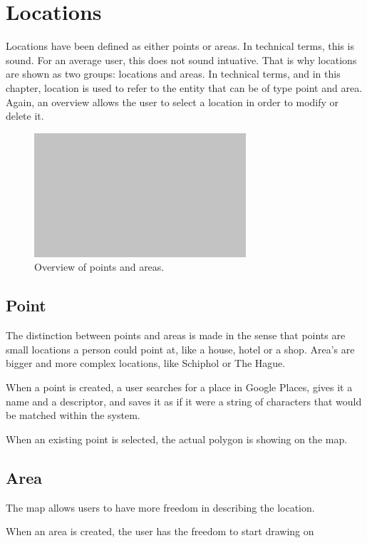 \section{Locations}
Locations have been defined as either points or areas. In technical terms, this is sound. For an average user, this does not sound intuative. That is why locations are shown as two groups: locations and areas. In technical terms, and in this chapter, location is used to refer to the entity that can be of type point and area. Again, an overview allows the user to select a location in order to modify or delete it.

\begin{figure}[H]
	\centering
	\includegraphics[width=0.7\textwidth]{Blank}
	\caption[Locations Overview]{Overview of points and areas.}
	\label{fig:Locations Overview}
\end{figure}

\subsection{Point}
The distinction between points and areas is made in the sense that points are small locations a person could point at, like a house, hotel or a shop. Area's are bigger and more complex locations, like Schiphol or The Hague.

When a point is created, a user searches for a place in Google Places, gives it a name and a descriptor, and saves it as if it were a string of characters that would be matched within the system.

When an existing point is selected, the actual polygon is showing on the map.

\subsection{Area}
The map allows users to have more freedom in describing the location.

When an area is created, the user has the freedom to start drawing on

